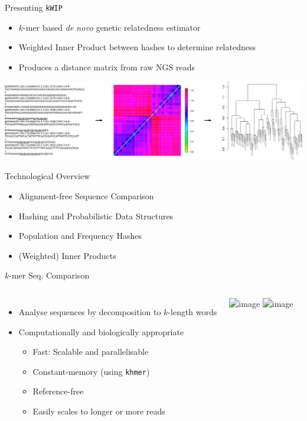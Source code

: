 \documentclass[t]{beamer}
\begin{document}
\begin{frame}{Presenting \texttt{kWIP}}
  \begin{itemize}
    \item $k$-mer based \textit{de novo} genetic relatedness estimator
    \item Weighted Inner Product between hashes to determine relatedness
    \item Produces a distance matrix from raw NGS reads
  \end{itemize}
  \begin{center}
    \includegraphics[width=\textwidth]{img/kwip-overview.png}
  \end{center}
\end{frame}

\begin{frame}{Technological Overview}
  \begin{itemize}
    \item Alignment-free Sequence Comparison
    \item Hashing and Probabilistic Data Structures
    \item Population and Frequency Hashes
    \item (Weighted) Inner Products
  \end{itemize}
\end{frame}

\begin{frame}{$k$-mer Seq. Comparison}
  \begin{columns}[t]
      \begin{itemize}
        \item<1-> Analyse sequences by decomposition to $k$-length words
        \item<1-> Computationally and biologically appropriate
        \begin{itemize}
          \item<1-> Fast: Scalable and parallelisable
          \item<1-> Constant-memory (using \texttt{khmer})
          \item<1-> Reference-free
          \item<1-> Easily scales to longer or more reads \end{itemize} \end{itemize}
    \begin{center}
      \includegraphics<1>[height=0.6\textheight]{img/ali.png}
      \includegraphics<2>[height=0.6\textheight]{img/ali-free.png}
    \end{center}
  \end{columns}
\end{frame}
\end{document}
